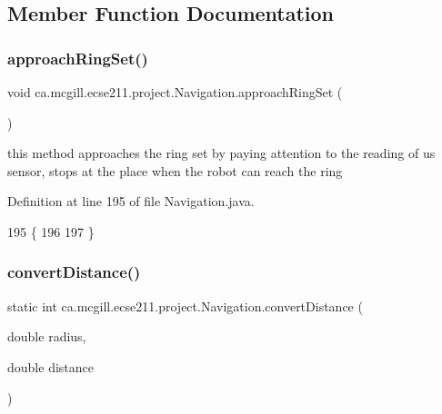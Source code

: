 \subsection{Member Function Documentation}
\mbox{\label{classca_1_1mcgill_1_1ecse211_1_1project_1_1_navigation_a1d8075346dbc151ca366e211e9056ccc}} 
\subsubsection{\texorpdfstring{approach\+Ring\+Set()}{approachRingSet()}}
{\footnotesize\ttfamily void ca.\+mcgill.\+ecse211.\+project.\+Navigation.\+approach\+Ring\+Set (\begin{DoxyParamCaption}{ }\end{DoxyParamCaption})}

this method approaches the ring set by paying attention to the reading of us sensor, stops at the place when the robot can reach the ring 

Definition at line 195 of file Navigation.\+java.


\begin{DoxyCode}
195                                 \{
196     
197   \}
\end{DoxyCode}
\mbox{\label{classca_1_1mcgill_1_1ecse211_1_1project_1_1_navigation_ac9e260bcd619ffa4820d7d0de7ea1c12}} 
\subsubsection{\texorpdfstring{convert\+Distance()}{convertDistance()}}
{\footnotesize\ttfamily static int ca.\+mcgill.\+ecse211.\+project.\+Navigation.\+convert\+Distance (\begin{DoxyParamCaption}\item[{double}]{radius,  }\item[{double}]{distance }\end{DoxyParamCaption})\hspace{0.3cm}{\ttfamily [static]}}

